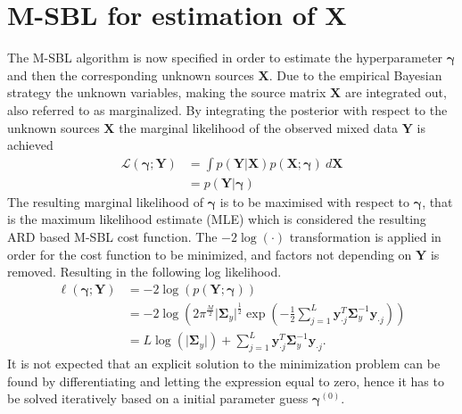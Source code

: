 \section{M-SBL for estimation of $\textbf{X}$}
The M-SBL algorithm is now specified in order to estimate the hyperparameter $\boldsymbol{\gamma}$ and then the corresponding unknown sources $\textbf{X}$.
Due to the empirical Bayesian strategy the unknown variables, making the source matrix $\mathbf{X}$ are integrated out, also referred to as marginalized.
By integrating the posterior with respect to the unknown sources $\mathbf{X}$ the marginal likelihood of the observed mixed data $\mathbf{Y}$ is achieved \cite[p. 146]{phd_wipf} 
\begin{align*}
\mathcal{L}(\boldsymbol{\gamma};\textbf{Y}) &= \int p (\mathbf{Y}  \vert \mathbf{X}) p (\mathbf{X} ; \boldsymbol{\gamma}) \ d\mathbf{X} \\
&= p (\mathbf{Y} \vert \boldsymbol{\gamma})
\end{align*}
The resulting marginal likelihood of $\boldsymbol{\gamma}$ is to be maximised with respect to $\boldsymbol{\gamma}$, that is the maximum likelihood estimate (MLE) which is considered the resulting ARD based M-SBL cost function. 
The $-2 \log (\cdot)$ transformation is applied in order for the cost function to be minimized, and factors not depending on $\textbf{Y}$ is removed. Resulting in the following log likelihood. 
\begin{align*}
\ell(\boldsymbol{\gamma};\textbf{Y})&= - 2 \log(p (\mathbf{Y} ; \boldsymbol{\gamma}))\\
&= -2\log \left( 2\pi^{\frac{M}{2}}\vert \boldsymbol{\Sigma}_{y}\vert^{\frac{1}{2}}\exp \left( - \frac{1}{2} \sum_{j=1}^L \textbf{y}_{\cdot j}^T \boldsymbol{\Sigma}_{y}^{-1} \textbf{y}_{\cdot j} \right) \right)\\
&= L \log ( \vert \boldsymbol{\Sigma}_y \vert ) + \sum_{j=1}^L \mathbf{y}_{\cdot j}^T \boldsymbol{\Sigma}_y ^{-1} \mathbf{y}_{\cdot j}.
\end{align*}
It is not expected that an explicit solution to the minimization problem can be found by differentiating and letting the expression equal to zero, hence it has to be solved iteratively based on a initial parameter guess $\boldsymbol{\gamma}^{(0)}$.

